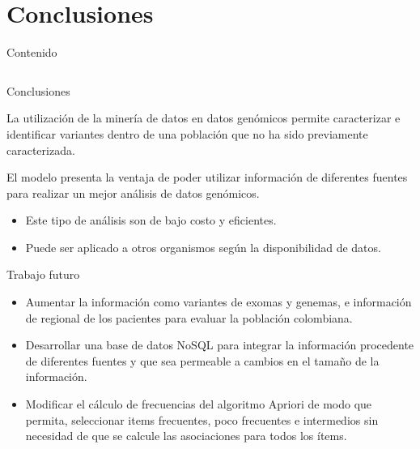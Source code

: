 \documentclass[xcolor=dvipsnames]{beamer}
\begin{document}
\section{Conclusiones}
\begin{frame}{Contenido}
    \begin{columns}[onlytextwidth,T]
        \begin{column}{.55\textwidth}
            \tableofcontents[currentsection, sections=1-3]
        \end{column}
        \begin{column}{.60\textwidth}
            \tableofcontents[currentsection, sections=4-]
        \end{column}
    \end{columns}
\end{frame}

\begin{frame}{Conclusiones}

	La utilización de la minería de datos en datos genómicos permite caracterizar e identificar variantes dentro de una población que no ha sido previamente caracterizada.
      
	\bigskip
    El modelo presenta la ventaja de poder utilizar información de diferentes fuentes para realizar un mejor análisis de datos genómicos. 
    \begin{itemize}
    \item Este tipo de análisis son de bajo costo y eficientes.
    \item Puede ser aplicado a otros organismos según la disponibilidad de datos.
    \end{itemize}
  
\end{frame}

\begin{frame}{Trabajo futuro}
\justifying 
 \begin{itemize}
 \justifying 

	\item Aumentar la información  como variantes de exomas y genemas, e información de regional de los pacientes para evaluar la población colombiana.

	\item Desarrollar una base de datos NoSQL para integrar la información procedente de diferentes fuentes y que sea permeable a cambios en el tamaño de la información.
	
	\item Modificar el cálculo de frecuencias del algoritmo Apriori de modo que permita, seleccionar items frecuentes, poco frecuentes e intermedios sin necesidad de que se calcule las asociaciones para todos los ítems. 

\end{itemize}
\end{frame}
\end{document}
